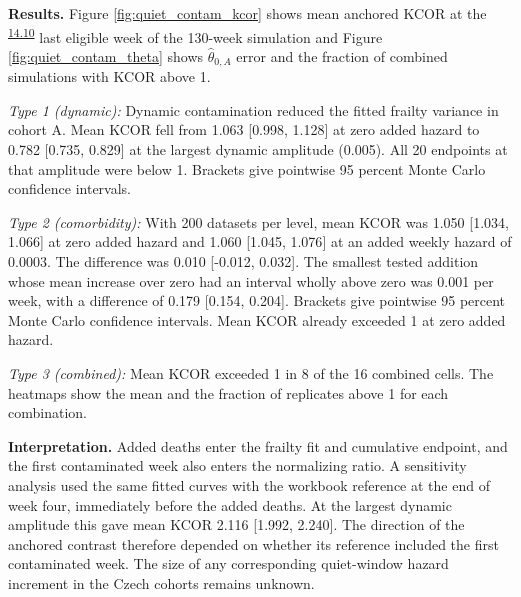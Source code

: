 \documentclass[
]{article}
\DeclareRobustCommand{\oldword}[1]{\leavevmode{\setbox0=\hbox{#1}\rlap{\raisebox{.5ex}{\rule{\wd0}{.45pt}}}\box0\relax}}
\begin{document}
\textbf{Results.} Figure \ref{fig:quiet_contam_kcor} shows mean anchored KCOR at the \textsuperscript{\hyperlink{issue-14.10}{14.10}} \oldword{final} \oldword{follow-up} \oldword{week} {\color{red}last eligible week of the 130-week simulation} and Figure \ref{fig:quiet_contam_theta} shows \(\hat\theta_{0,A}\) error and the fraction of combined simulations with KCOR above 1.

\emph{Type 1 (dynamic):} Dynamic contamination reduced the fitted frailty variance in cohort A. Mean KCOR fell from 1.063 {[}0.998, 1.128{]} at zero added hazard to 0.782 {[}0.735, 0.829{]} at the largest dynamic amplitude (0.005). All 20 endpoints at that amplitude were below 1. Brackets give pointwise 95 percent Monte Carlo confidence intervals.

\emph{Type 2 (comorbidity):} With 200 datasets per level, mean KCOR was 1.050 {[}1.034, 1.066{]} at zero added hazard and 1.060 {[}1.045, 1.076{]} at an added weekly hazard of 0.0003. The difference was 0.010 {[}-0.012, 0.032{]}. The smallest tested addition whose mean increase over zero had an interval wholly above zero was 0.001 per week, with a difference of 0.179 {[}0.154, 0.204{]}. Brackets give pointwise 95 percent Monte Carlo confidence intervals. Mean KCOR already exceeded 1 at zero added hazard.

\emph{Type 3 (combined):} Mean KCOR exceeded 1 in 8 of the 16 combined cells. The heatmaps show the mean and the fraction of replicates above 1 for each combination.

\textbf{Interpretation.} Added deaths enter the frailty fit and cumulative endpoint, and the first contaminated week also enters the normalizing ratio. A sensitivity analysis used the same fitted curves with the workbook reference at the end of week four, immediately before the added deaths. At the largest dynamic amplitude this gave mean KCOR 2.116 {[}1.992, 2.240{]}. The direction of the anchored contrast therefore depended on whether its reference included the first contaminated week. The size of any corresponding quiet-window hazard increment in the Czech cohorts remains unknown.
\end{document}
